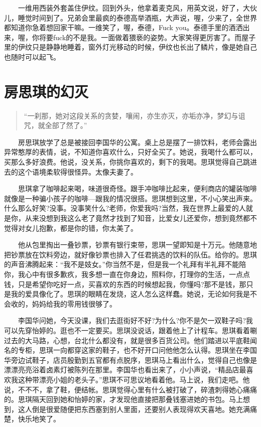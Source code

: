 \documentclass[12pt,UTF8]{ctexbook}
\begin{document}
　　一维用西装外套盖住伊纹。回到外头，他拿着麦克风，用英文说，好了，大伙儿，睡觉时间到了。兄弟会里最疯的泰德高举酒瓶，大声说，喔，少来了，全世界都知道你急着想回家干嘛。一维笑了，喔，泰德，Fuck you。泰德手里的酒洒出来，喔，你将要fuck的不是我。一面做着猥亵的姿势。大家笑得更厉害了。而屋子里的伊纹只是静静地睡着，窗外灯光移动的时候，伊纹也长出了鳞片，像是她自己也随时可以起飞。

\hypertarget{ux623fux601dux742aux7684ux5e7bux706d}{%
\section*{房思琪的幻灭}\label{ux623fux601dux742aux7684ux5e7bux706d}}

\begin{quote}
\enquote{一刹那，她对这段关系的贪婪，嚷闹，亦生亦灭，亦垢亦净，梦幻与诅咒，就全部了然了。}
\end{quote}

　　房思琪放学了总是被接回李国华的公寓。桌上总是摆了一排饮料，老师会露出异常憨厚的表情，说，不知道你喜欢什么，只好全买了。她说，我喝什么都可以，买那么多好浪费。他说，没关系，你挑你喜欢的，剩下的我喝。思琪觉得自己跳进去的这个语境柔软得很怪异。太像夫妻了。

　　思琪拿了咖啡起来喝，味道很奇怪。跟手冲咖啡比起来，便利商店的罐装咖啡就像是一种骗小孩子的咖啡---跟我的情况很搭。思琪想到这里，不小心笑出声来。什么那么好笑?没事。没事笑什么?老师，你爱我吗?当然，我在世界上最爱的人就是你，从来没想到我这么老了竟然才找到了知音，比爱女儿还爱你，想到竟然都不觉得对女儿抱歉，都是你的错，你太美了。

　　他从包里掏出一叠钞票，钞票有银行束带，思琪一望即知是十万元。他随意地把钞票放在饮料旁边，就好像钞票也排入了任君挑选的饮料的队伍。给你的。思琪的声音沸腾起来：\enquote{我不是妓女。}你当然不是，但是我一个礼拜有半礼拜不能陪你，我心中有很多歉疚，我多想一直在你身边，照料你，打理你的生活，一点点钱，只是希望你吃好一点，买喜欢的东西的时候想起我，你懂吗?那不是钱，那只是我的爱具像化了。思琪的眼睛在发烧，这人怎么这样蠢。她说，无论如何我是不会收的，妈妈给我的零用钱很够了。

　　李国华问她，今天没课，我们去逛街好不好?为什么?你不是欠一双鞋子吗?我可以先穿怡婷的。逛也不一定要买。思琪没说话，跟着他上了计程车。思琪看着唰过去的大马路，心想，台北什么都没有，就是很多百货公司。他们踏进以平底鞋闻名的专柜，思琪一向都穿这家的鞋子，也不好开口问他他怎么认得。思琪坐在李国华旁边试鞋子，店员殷勤到五官都有点脱序，思琪马上看出什么，觉得自己也像是漂漂亮亮浴着卤素灯被陈列在那里。李国华也看出来了，小小声说，\enquote{精品店最喜欢我这种带漂亮小姐的老头子。}思琪不可思议地看着他。马上说，我们走吧。他说，不不不，拿了鞋，便结帐。思琪觉得心里有什么被打破了，碎渣刺得她心痛痛的。思琪隔天回到她和怡婷的家，才发现他直接把那叠钱塞进她的书包。马上想到，这人倒是很爱随便把东西塞到别人里面，还要别人表现得欢天喜地。她充满痛楚，快乐地笑了。
\end{document}

